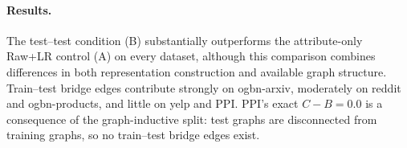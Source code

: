 \documentclass{article}
\begin{document}
\paragraph{Results.} The test--test condition (B) substantially
outperforms the attribute-only Raw+LR control (A) on every dataset,
although this comparison combines differences in both representation
construction and available graph structure. Train--test bridge edges
contribute strongly on ogbn-arxiv, moderately on reddit and
ogbn-products, and little on yelp and PPI. PPI's exact $C - B = 0.0$
is a consequence of the graph-inductive split: test graphs are
disconnected from training graphs, so no train--test bridge edges
exist.
\end{document}
